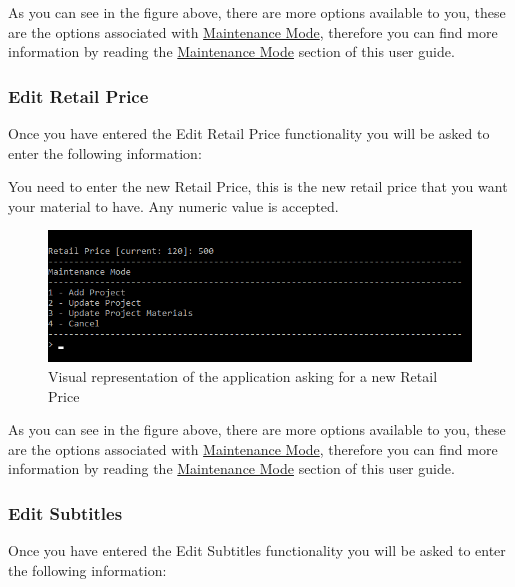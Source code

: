 \documentclass[
  english,
  a4paper,
,tablecaptionabove
]{scrartcl}
\begin{document}
As you can see in the figure above, there are more options available to
you, these are the options associated with
\protect\hyperlink{using-maintenance-mode}{Maintenance Mode}, therefore
you can find more information by reading the
\protect\hyperlink{using-maintenance-mode}{Maintenance Mode} section of
this user guide.

\newpage

\hypertarget{edit-retail-price-1}{%
\subsubsection{Edit Retail Price}\label{edit-retail-price-1}}

Once you have entered the Edit Retail Price functionality you will be
asked to enter the following information:

You need to enter the new Retail Price, this is the new retail price
that you want your material to have. Any numeric value is accepted.

\begin{figure}
\centering
\includegraphics{images/user-guide/maintenance-mode/update-project-material-retail-price.png}
\caption{Visual representation of the application asking for a new
Retail Price}
\end{figure}

As you can see in the figure above, there are more options available to
you, these are the options associated with
\protect\hyperlink{using-maintenance-mode}{Maintenance Mode}, therefore
you can find more information by reading the
\protect\hyperlink{using-maintenance-mode}{Maintenance Mode} section of
this user guide.

\newpage

\hypertarget{edit-subtitles-1}{%
\subsubsection{Edit Subtitles}\label{edit-subtitles-1}}

Once you have entered the Edit Subtitles functionality you will be asked
to enter the following information:
\end{document}
